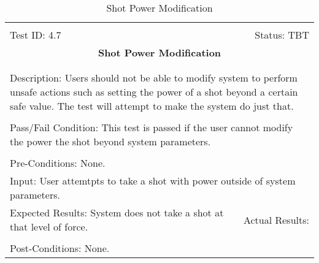 \documentclass[titlepage]{article}
\begin{document}
\begin{center}%
\begin{table}[h!]
\begin{tabular}{|l r|}\hline&\\[-2mm]
	Test ID: 4.7	&Status: TBT\\[-3mm]
	\multicolumn{2}{|c|}{\textbf{\large{Shot Power Modification}}}\\&\\\hline&\\[-3mm]
	\multicolumn{2}{|p{\textwidth}|}{Description: Users should not be able to modify system to perform unsafe actions such as setting the power of a shot beyond a certain safe value. The test will attempt to make the system do just that.}\\[1mm]\hline&\\[-3mm]
	\multicolumn{2}{|p{\textwidth}|}{Pass/Fail Condition: This test is passed if the user cannot modify the power the shot beyond system parameters.}\\[1mm]\hline&\\[-3mm]
	\multicolumn{2}{|p{\textwidth}|}{Pre-Conditions: None.}\\[4mm]
	\multicolumn{2}{|p{\textwidth}|}{Input: User attemtpts to take a shot with power outside of system parameters.}\\[2mm]\hline
	\multicolumn{1}{|p{0.49\textwidth}}{Expected Results: System does not take a shot at that level of force.}	&\multicolumn{1}{|p{0.45\textwidth}|}{Actual Results:}\\\hline&\\[-3mm]
	\multicolumn{2}{|p{\textwidth}|}{Post-Conditions: None.}\\\hline
\end{tabular}
\caption{Shot Power Modification}
\end{table}
\end{center}
\end{document}
